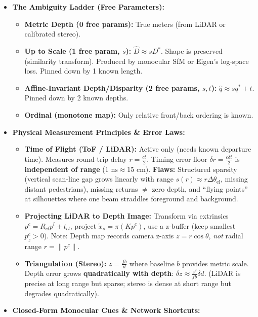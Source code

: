 \documentclass[10pt, a4paper]{article}
\begin{document}
\begin{itemize}
    \item \textbf{The Ambiguity Ladder (Free Parameters):}
    \begin{itemize}
        \item \textbf{Metric Depth (0 free params):} True meters (from LiDAR or calibrated stereo).
        \item \textbf{Up to Scale (1 free param, $s$):} $\hat{D} \approx s D^*$. Shape is preserved (similarity transform). Produced by monocular SfM or Eigen's log-space loss. Pinned down by 1 known length.
        \item \textbf{Affine-Invariant Depth/Disparity (2 free params, $s, t$):} $\hat{q} \approx s q^* + t$. Pinned down by 2 known depths.
        \item \textbf{Ordinal (monotone map):} Only relative front/back ordering is known.
    \end{itemize}
    \item \textbf{Physical Measurement Principles \& Error Laws:}
    \begin{itemize}
        \item \textbf{Time of Flight (ToF / LiDAR):} Active only (needs known departure time). Measures round-trip delay $r = \frac{ct}{2}$. Timing error floor $\delta r = \frac{c\delta t}{2}$ is \textbf{independent of range} ($1\text{ ns} \approx 15\text{ cm}$). \textbf{Flaws:} Structured sparsity (vertical scan-line gap grows linearly with range $s(r) \approx r\Delta\theta_{\text{el}}$, missing distant pedestrians), missing returns $\neq$ zero depth, and ``flying points'' at silhouettes where one beam straddles foreground and background.
        \item \textbf{Projecting LiDAR to Depth Image:} Transform via extrinsics $p^c = R_{cl}p^l + t_{cl}$, project $\tilde{x}_s = \pi(Kp^c)$, use a z-buffer (keep smallest $p_z^c > 0$). Note: Depth map records camera z-axis $z = r\cos\theta$, \emph{not} radial range $r = \|p^c\|$.
        \item \textbf{Triangulation (Stereo):} $z = \frac{fb}{d}$ where baseline $b$ provides metric scale. Depth error grows \textbf{quadratically with depth}: $\delta z \approx \frac{z^2}{fb}\delta d$. (LiDAR is precise at long range but sparse; stereo is dense at short range but degrades quadratically).
    \end{itemize}
    \item \textbf{Closed-Form Monocular Cues \& Network Shortcuts:}
    \begin{itemize}

\end{itemize}
\end{itemize}
\end{document}
